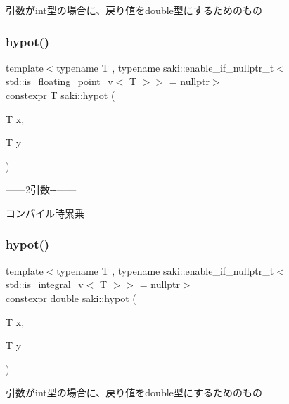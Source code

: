 引数がint型の場合に、戻り値をdouble型にするためのもの 

\mbox{\label{namespacesaki_a0dfe75bfa0e5223a0390c5e2941e69bc}} 
\subsubsection{\texorpdfstring{hypot()}{hypot()}\hspace{0.1cm}{\footnotesize\ttfamily [1/6]}}
{\footnotesize\ttfamily template$<$typename T , typename saki\+::enable\+\_\+if\+\_\+nullptr\+\_\+t$<$ std\+::is\+\_\+floating\+\_\+point\+\_\+v$<$ T $>$$>$  = nullptr$>$ \\
constexpr T saki\+::hypot (\begin{DoxyParamCaption}\item[{T}]{x,  }\item[{T}]{y }\end{DoxyParamCaption})}



------2引数-\/-\/------ 

コンパイル時累乗 \mbox{\label{namespacesaki_ad888da163ba5c006d664d564fb48f7a7}} 
\subsubsection{\texorpdfstring{hypot()}{hypot()}\hspace{0.1cm}{\footnotesize\ttfamily [2/6]}}
{\footnotesize\ttfamily template$<$typename T , typename saki\+::enable\+\_\+if\+\_\+nullptr\+\_\+t$<$ std\+::is\+\_\+integral\+\_\+v$<$ T $>$$>$  = nullptr$>$ \\
constexpr double saki\+::hypot (\begin{DoxyParamCaption}\item[{T}]{x,  }\item[{T}]{y }\end{DoxyParamCaption})}



引数がint型の場合に、戻り値をdouble型にするためのもの 

\mbox{\label{namespacesaki_ae2b457ea76e5aedc8279d8c78a07b26b}} 
